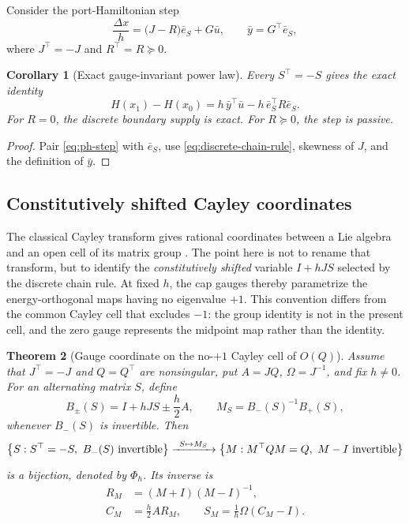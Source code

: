 \documentclass[11pt,a4paper]{article}
\newtheorem{theorem}{Theorem}[section]
\newtheorem{corollary}[theorem]{Corollary}
\begin{document}
Consider the port-Hamiltonian step
\begin{equation}\label{eq:ph-step}
 \frac{\Delta x}{h}
 =\bigl(J-R\bigr)\bar e_S+G\bar u,
 \qquad
 \bar y=G^\top\bar e_S,
\end{equation}
where \(J^\top=-J\) and \(R^\top=R\succeq0\).

\begin{corollary}[Exact gauge-invariant power law]\label{cor:power}
Every \(S^\top=-S\) gives the exact identity
\begin{equation}\label{eq:power-law}
 H(x_1)-H(x_0)
 =h\,\bar y^\top\bar u-h\,\bar e_S^\top R\bar e_S.
\end{equation}
For \(R=0\), the discrete boundary supply is exact. For \(R\succeq0\), the
step is passive.
\end{corollary}

\begin{proof}
Pair \cref{eq:ph-step} with \(\bar e_S\), use
\cref{eq:discrete-chain-rule}, skewness of \(J\), and the definition of
\(\bar y\).
\end{proof}

\subsection{Constitutively shifted Cayley coordinates}

The classical Cayley transform gives rational coordinates between a Lie
algebra and an open cell of its matrix group
\cite{kostant2001,maslovskaya2024}.  The point here is not to rename that
transform, but to identify the \emph{constitutively shifted} variable
\(I+hJS\) selected by the discrete chain rule.  At fixed \(h\), the cap
gauges thereby parametrize the energy-orthogonal maps having no
eigenvalue \(+1\).  This convention differs from the common Cayley cell
that excludes \(-1\): the group identity is not in the present cell, and
the zero gauge represents the midpoint map rather than the identity.

\begin{theorem}[Gauge coordinate on the no-\(+1\) Cayley cell of \(O(Q)\)]
\label{thm:gauge-cayley-chart}
Assume that \(J^\top=-J\) and \(Q=Q^\top\) are nonsingular, put
\(A=JQ\), \(\Omega=J^{-1}\), and fix \(h\ne0\).  For an alternating
matrix \(S\), define
\begin{equation}\label{eq:cap-cayley-blocks}
 B_\pm(S)=I+hJS\mathbin{\pm}\frac h2A,
 \qquad M_S=B_-(S)^{-1}B_+(S),
\end{equation}
whenever \(B_-(S)\) is invertible.  Then
\begin{equation}\label{eq:gauge-cayley-bijection}
 \left\{S:S^\top=-S,\ B_-(S)\text{ invertible}\right\}
 \xrightarrow[\hspace{12mm}]{\ S\mapsto M_S\ }
 \left\{M:M^\top QM=Q,\ M-I\text{ invertible}\right\}
\end{equation}
is a bijection, denoted by \(\Phi_h\).  Its inverse is
\begin{align}
 R_M&=(M+I)(M-I)^{-1},\label{eq:energy-cayley-ratio}\\
 C_M&=\frac h2A R_M,\qquad
 S_M=\frac1h\Omega(C_M-I).\label{eq:inverse-gauge-cayley}
\end{align}
\end{theorem}
\end{document}
